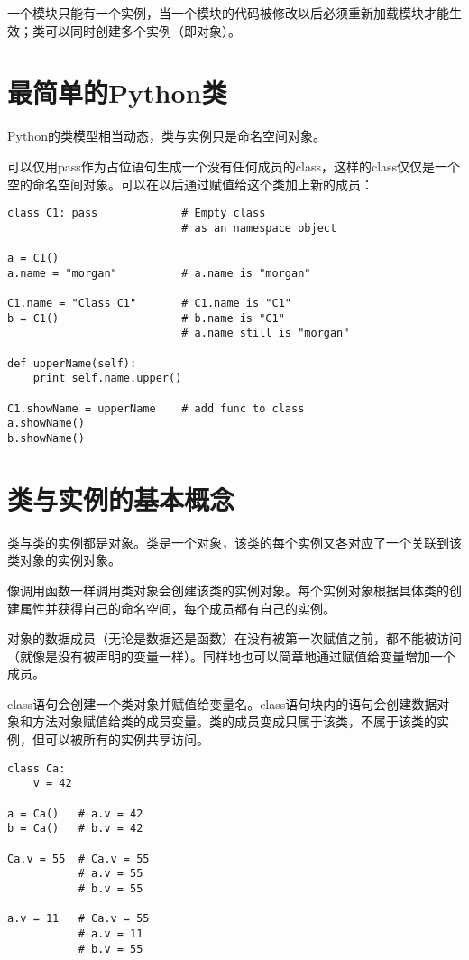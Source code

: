 
一个模块只能有一个实例，当一个模块的代码被修改以后必须重新加载模块才能生效；类可以同时创建多个实例（即对象）。

\section{最简单的Python类}

Python的类模型相当动态，类与实例只是命名空间对象。

可以仅用pass作为占位语句生成一个没有任何成员的class，这样的class仅仅是一个空的命名空间对象。可以在以后通过赋值给这个类加上新的成员：

\begin{lstlisting}
class C1: pass             # Empty class
                           # as an namespace object

a = C1()
a.name = "morgan"          # a.name is "morgan"

C1.name = "Class C1"       # C1.name is "C1"
b = C1()                   # b.name is "C1"
                           # a.name still is "morgan"

def upperName(self):
	print self.name.upper()

C1.showName = upperName    # add func to class
a.showName()
b.showName()
\end{lstlisting}

\section{类与实例的基本概念}

类与类的实例都是对象。类是一个对象，该类的每个实例又各对应了一个关联到该类对象的实例对象。

像调用函数一样调用类对象会创建该类的实例对象。每个实例对象根据具体类的创建属性并获得自己的命名空间，每个成员都有自己的实例。

对象的数据成员（无论是数据还是函数）在没有被第一次赋值之前，都不能被访问（就像是没有被声明的变量一样）。同样地也可以简章地通过赋值给变量增加一个成员。

class语句会创建一个类对象并赋值给变量名。class语句块内的语句会创建数据对象和方法对象赋值给类的成员变量。类的成员变成只属于该类，不属于该类的实例，但可以被所有的实例共享访问。

\begin{lstlisting}
class Ca:
	v = 42

a = Ca()   # a.v = 42
b = Ca()   # b.v = 42

Ca.v = 55  # Ca.v = 55
           # a.v = 55
		   # b.v = 55

a.v = 11   # Ca.v = 55
           # a.v = 11
		   # b.v = 55
\end{lstlisting}

